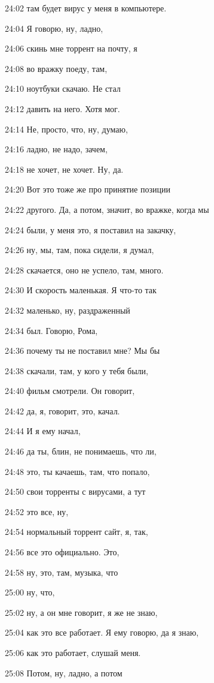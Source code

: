 24:02
там будет вирус у меня в компьютере.

24:04
Я говорю, ну, ладно,

24:06
скинь мне торрент на почту, я

24:08
во вражку поеду, там,

24:10
ноутбуки скачаю. Не стал

24:12
давить на него. Хотя мог.

24:14
Не, просто, что, ну, думаю,

24:16
ладно, не надо, зачем,

24:18
не хочет, не хочет. Ну, да.

24:20
Вот это тоже же про принятие позиции

24:22
другого. Да, а потом, значит, во вражке, когда мы

24:24
были, у меня это, я поставил на закачку,

24:26
ну, мы, там, пока сидели, я думал,

24:28
скачается, оно не успело, там, много.

24:30
И скорость маленькая. Я что-то так

24:32
маленько, ну, раздраженный

24:34
был. Говорю, Рома,

24:36
почему ты не поставил мне? Мы бы

24:38
скачали, там, у кого у тебя были,

24:40
фильм смотрели. Он говорит,

24:42
да, я, говорит, это, качал.

24:44
И я ему начал,

24:46
да ты, блин, не понимаешь, что ли,

24:48
это, ты качаешь, там, что попало,

24:50
свои торренты с вирусами, а тут

24:52
это все, ну,

24:54
нормальный торрент сайт, я, так,

24:56
все это официально. Это,

24:58
ну, это, там, музыка, что

25:00
ну, что,

25:02
ну, а он мне говорит, я же не знаю,

25:04
как это все работает. Я ему говорю, да я знаю,

25:06
как это работает, слушай меня.

25:08
Потом, ну, ладно, а потом

